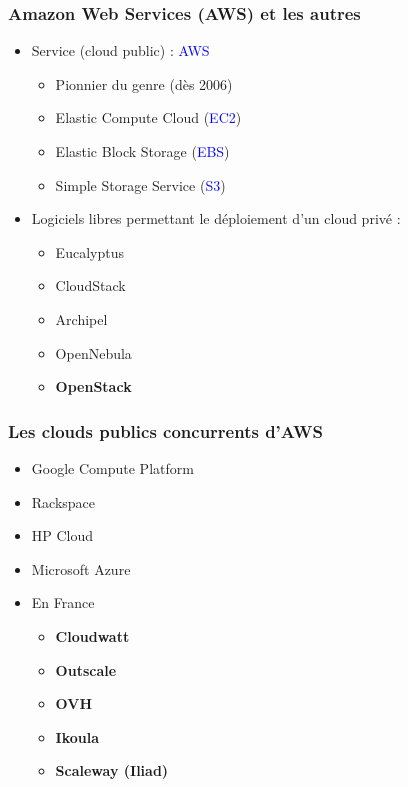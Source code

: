   \begin{frame}
    \frametitle{Amazon Web Services (AWS) et les autres}
    \begin{itemize}
      \item Service (cloud public) : \textcolor{blue}{AWS}
      \begin{itemize}
        \item Pionnier du genre (dès 2006)
        \item Elastic Compute Cloud (\textcolor{blue}{EC2})
        \item Elastic Block Storage (\textcolor{blue}{EBS})
        \item Simple Storage Service (\textcolor{blue}{S3})
      \end{itemize}
        \item Logiciels libres permettant le déploiement d'un cloud privé :
      \begin{itemize}
        \item Eucalyptus
        \item CloudStack
        \item Archipel
        \item OpenNebula
        \item \textbf{OpenStack}
      \end{itemize}
    \end{itemize}
  \end{frame}

  \begin{frame}
    \frametitle{Les clouds publics concurrents d'AWS}
    \begin{itemize}
      \item Google Compute Platform
      \item Rackspace
      \item HP Cloud
      \item Microsoft Azure
      \item En France
      \begin{itemize}
        \item \textbf{Cloudwatt}
        \item \textbf{Outscale}
        \item \textbf{OVH}
        \item \textbf{Ikoula}
        \item \textbf{Scaleway (Iliad)}
      \end{itemize}
    \end{itemize}
  \end{frame}

